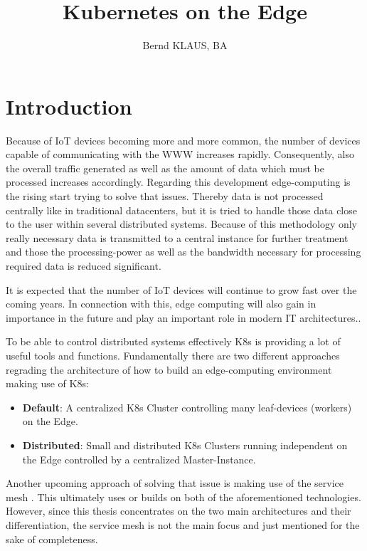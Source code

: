 \documentclass[MSC,Master,english]{twbook}%
\title{Kubernetes on the Edge}
\author{Bernd KLAUS, BA}
\begin{document}
\maketitle
\chapter{Introduction}
\label{chap:introduction}
Because of \ac{IoT} devices becoming more and more common, the number of devices capable of communicating with the \ac{WWW} increases rapidly. Consequently, also the overall traffic generated as well as the amount of data which must be processed increases accordingly. Regarding this development edge-computing is the rising start trying to solve that issues. Thereby data is not processed centrally like in traditional datacenters, but it is tried to handle those data close to the user within several distributed systems. Because of this methodology only really necessary data is transmitted to a central instance for further treatment and those the processing-power as well as the bandwidth necessary for processing required data is reduced significant. 
\par It is expected that the number of IoT devices will continue to grow fast \cite{SotE21} over the coming years. In connection with this, edge computing will also gain in importance in the future and play an important role in modern \ac{IT} architectures.. 
\par To be able to control distributed systems effectively \ac{K8s} is providing a lot of useful tools and functions. Fundamentally there are two different approaches regrading the architecture of how to build an edge-computing environment making use of \ac{K8s}:

\begin{itemize}
    \label{item:architecture}
    \item \textbf{Default}: A centralized \ac{K8s} Cluster controlling many leaf-devices (workers) on the Edge.
    \item \textbf{Distributed}: Small and distributed \ac{K8s} Clusters running independent on the Edge controlled by a centralized Master-Instance.
\end{itemize}

Another upcoming approach of solving that issue is making use of the service mesh \cite{servicemesh}. This ultimately uses or builds on both of the aforementioned technologies. However, since this thesis concentrates on the two main architectures and their differentiation, the service mesh is not the main focus and just mentioned for the sake of completeness.
\end{document}
